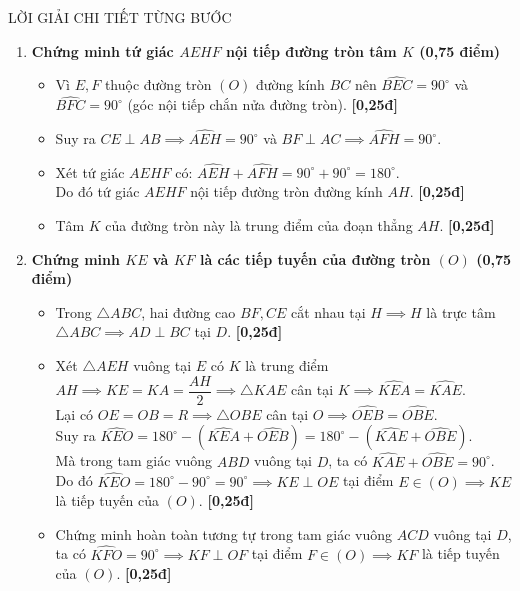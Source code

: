 \documentclass[11pt,a4paper]{article}
\begin{document}
\begin{solutionbox}{LỜI GIẢI CHI TIẾT TỪNG BƯỚC}
\begin{enumerate}[label=\textbf{\arabic*.}, leftmargin=*]
    \item \textbf{Chứng minh tứ giác $AEHF$ nội tiếp đường tròn tâm $K$ (0,75 điểm)}
    \begin{itemize}[leftmargin=*, nosep]
        \item Vì $E, F$ thuộc đường tròn $(O)$ đường kính $BC$ nên $\widehat{BEC} = 90^\circ$ và $\widehat{BFC} = 90^\circ$ (góc nội tiếp chắn nửa đường tròn). \hfill \textbf{[0,25đ]}
        \item Suy ra $CE \perp AB \implies \widehat{AEH} = 90^\circ$ và $BF \perp AC \implies \widehat{AFH} = 90^\circ$.
        \item Xét tứ giác $AEHF$ có: $\widehat{AEH} + \widehat{AFH} = 90^\circ + 90^\circ = 180^\circ$.\\
        Do đó tứ giác $AEHF$ nội tiếp đường tròn đường kính $AH$. \hfill \textbf{[0,25đ]}
        \item Tâm $K$ của đường tròn này là trung điểm của đoạn thẳng $AH$. \hfill \textbf{[0,25đ]}
    \end{itemize}

    \vspace{1mm}
    \item \textbf{Chứng minh $KE$ và $KF$ là các tiếp tuyến của đường tròn $(O)$ (0,75 điểm)}
    \begin{itemize}[leftmargin=*, nosep]
        \item Trong $\triangle ABC$, hai đường cao $BF, CE$ cắt nhau tại $H \implies H$ là trực tâm $\triangle ABC \implies AD \perp BC$ tại $D$. \hfill \textbf{[0,25đ]}
        \item Xét $\triangle AEH$ vuông tại $E$ có $K$ là trung điểm $AH \implies KE = KA = \dfrac{AH}{2} \implies \triangle KAE$ cân tại $K \implies \widehat{KEA} = \widehat{KAE}$.\\
        Lại có $OE = OB = R \implies \triangle OBE$ cân tại $O \implies \widehat{OEB} = \widehat{OBE}$.\\
        Suy ra $\widehat{KEO} = 180^\circ - (\widehat{KEA} + \widehat{OEB}) = 180^\circ - (\widehat{KAE} + \widehat{OBE})$.\\
        Mà trong tam giác vuông $ABD$ vuông tại $D$, ta có $\widehat{KAE} + \widehat{OBE} = 90^\circ$.\\
        Do đó $\widehat{KEO} = 180^\circ - 90^\circ = 90^\circ \implies KE \perp OE$ tại điểm $E \in (O) \implies KE$ là tiếp tuyến của $(O)$. \hfill \textbf{[0,25đ]}
        \item Chứng minh hoàn toàn tương tự trong tam giác vuông $ACD$ vuông tại $D$, ta có $\widehat{KFO} = 90^\circ \implies KF \perp OF$ tại điểm $F \in (O) \implies KF$ là tiếp tuyến của $(O)$. \hfill \textbf{[0,25đ]}
    \end{itemize}


\end{enumerate}
\end{solutionbox}
\end{document}
